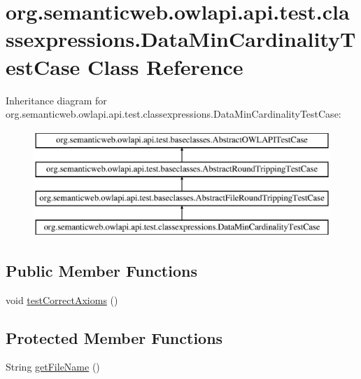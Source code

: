 \hypertarget{classorg_1_1semanticweb_1_1owlapi_1_1api_1_1test_1_1classexpressions_1_1_data_min_cardinality_test_case}{\section{org.\-semanticweb.\-owlapi.\-api.\-test.\-classexpressions.\-Data\-Min\-Cardinality\-Test\-Case Class Reference}
\label{classorg_1_1semanticweb_1_1owlapi_1_1api_1_1test_1_1classexpressions_1_1_data_min_cardinality_test_case}
}
Inheritance diagram for org.\-semanticweb.\-owlapi.\-api.\-test.\-classexpressions.\-Data\-Min\-Cardinality\-Test\-Case\-:\begin{figure}[H]
\begin{center}
\leavevmode
\includegraphics[height=4.000000cm]{classorg_1_1semanticweb_1_1owlapi_1_1api_1_1test_1_1classexpressions_1_1_data_min_cardinality_test_case}
\end{center}
\end{figure}
\subsection*{Public Member Functions}
\begin{DoxyCompactItemize}
\item 
void \hyperlink{classorg_1_1semanticweb_1_1owlapi_1_1api_1_1test_1_1classexpressions_1_1_data_min_cardinality_test_case_aa752af9e780edeeff013b498a3ee7ab1}{test\-Correct\-Axioms} ()
\end{DoxyCompactItemize}
\subsection*{Protected Member Functions}
\begin{DoxyCompactItemize}
\item 
String \hyperlink{classorg_1_1semanticweb_1_1owlapi_1_1api_1_1test_1_1classexpressions_1_1_data_min_cardinality_test_case_a71a95cd0e076d063891ed69801115e90}{get\-File\-Name} ()
\end{DoxyCompactItemize}


